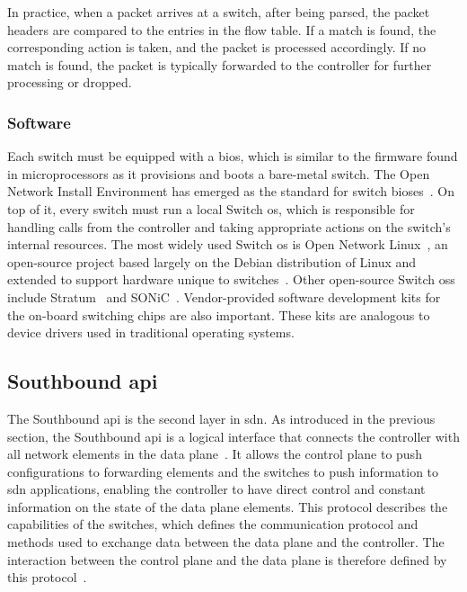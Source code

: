 In practice, when a packet arrives at a switch, after being parsed, the packet headers are compared to the entries in the flow table. If a match is found, the corresponding action is taken, and the packet is processed accordingly. If no match is found, the packet is typically forwarded to the controller for further processing or dropped.

\subsubsection{Software}

Each switch must be equipped with a \gls{bios}, which is similar to the firmware found in microprocessors as it provisions and boots a bare-metal switch. The Open Network Install Environment has emerged as the standard for switch \gls{bios}es~\cite{peterson_software-defined_2021}. On top of it, every switch must run a local Switch \gls{os}, which is responsible for handling calls from the controller and taking appropriate actions on the switch's internal resources. The most widely used Switch \gls{os} is Open Network Linux~\cite{noauthor_linux_nodate}, an open-source project based largely on the Debian distribution of Linux and extended to support hardware unique to switches~\cite{peterson_software-defined_2021}. Other open-source Switch \glspl{os} include Stratum~\cite{noauthor_stratum_nodate} and SONiC~\cite{noauthor_sonic_nodate}. Vendor-provided software development kits for the on-board switching chips are also important. These kits are analogous to device drivers used in traditional operating systems. 


\subsection[Southbound API]{Southbound \gls{api}} %

The Southbound \gls{api} is the second layer in \gls{sdn}. As introduced in the previous section, the Southbound \gls{api} is a logical interface that connects the controller with all network elements in the data plane~\cite{thyagaturu_software_2016}. It allows the control plane to push configurations to forwarding elements and the switches to push information to \gls{sdn} applications, enabling the controller to have direct control and constant information on the state of the data plane elements. 
This protocol describes the capabilities of the switches, which defines the communication protocol and methods used to exchange data between the data plane and the controller. The interaction between the control plane and the data plane is therefore defined by this protocol~\cite{kreutz_software-defined_2015}. 

